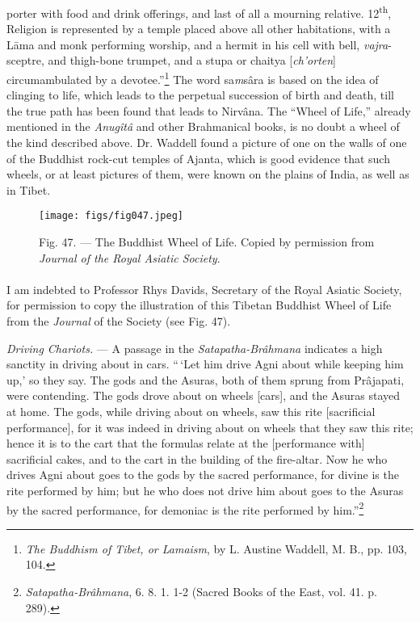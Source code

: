 \documentclass[a4paper, 11pt, oneside, polutonikogreek, english]{article}
\begin{document}
porter with food and drink offerings, and last of all a mourning relative. 12\textsuperscript{th}, Religion is represented by a temple placed above all other habitations, with a Lāma and monk performing worship, and a hermit in his cell with bell, \emph{vajra}-sceptre, and thigh-bone trumpet, and a stupa or chaitya [\emph{ch'orten}] circumambulated by a devotee.''\footnote{\emph{The Buddhism of Tibet, or Lamaism}, by L. Austine Waddell, M. B., pp. 103, 104.} The word sa\emph{m}sâra is based on the idea of clinging to life, which leads to the perpetual succession of birth and death, till the true path has been found that leads to Nirvâna. The ``Wheel of Life,'' already mentioned in the \emph{Anugîtâ} and other Brahmanical books, is no doubt a wheel of the kind described above. Dr. Waddell found a picture of one on the walls of one of the Buddhist rock-cut temples of Ajanta, which is good evidence that such wheels, or at least pictures of them, were known on the plains of India, as well as in Tibet.

\begin{figure}[H]
\centering
\texttt{[image: figs/fig047.jpeg]}
\caption[Fig. 47. --- The Buddhist Wheel of Life.]{Fig. 47. --- The Buddhist Wheel of Life. Copied by permission from \emph{Journal of the Royal Asiatic Society}.}
\end{figure}
\paragraph{}
I am indebted to Professor Rhys Davids, Secretary of the Royal Asiatic Society, for permission to copy the illustration of this Tibetan Buddhist Wheel of Life from the \emph{Journal} of the Society (see Fig. 47).

\emph{Driving Chariots.} --- A passage in the \emph{Satapatha-Brâhmana} indicates a high sanctity in driving about in cars. ``\,`Let him drive Agni about while keeping him up,' so they say. The gods and the Asuras, both of them sprung from Prâjapati, were contending. The gods drove about on wheels [cars], and the Asuras stayed at home. The gods, while driving about on wheels, saw this rite [sacrificial performance], for it was indeed in driving about on wheels that they saw this rite; hence it is to the cart that the formulas relate at the [performance with] sacrificial cakes, and to the cart in the building of the fire-altar. Now he who drives Agni about goes to the gods by the sacred performance, for divine is the rite performed by him; but he who does not drive him about goes to the Asuras by the sacred performance, for demoniac is the rite performed by him.''\footnote{\emph{Satapatha-Brâhmana}, 6. 8. 1. 1-2 (Sacred Books of the East, vol. 41. p. 289).}
\end{document}
